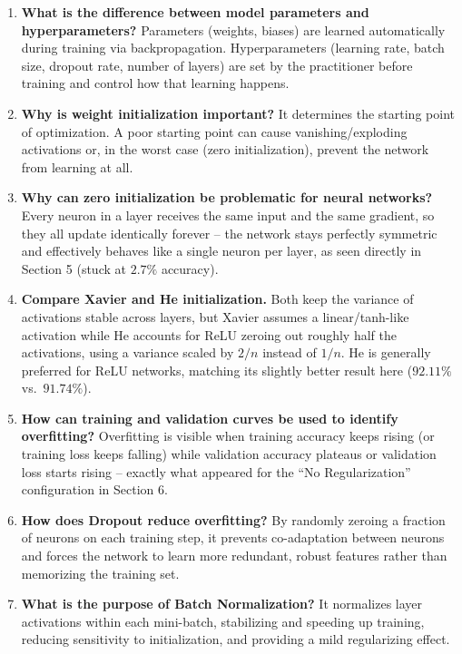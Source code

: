 \documentclass[10pt]{article}
\begin{document}
\begin{enumerate}
\item \textbf{What is the difference between model parameters and hyperparameters?}
Parameters (weights, biases) are learned automatically during training via
backpropagation. Hyperparameters (learning rate, batch size, dropout
rate, number of layers) are set by the practitioner before training
and control how that learning happens.

\item \textbf{Why is weight initialization important?}
It determines the starting point of optimization. A poor starting
point can cause vanishing/exploding activations or, in the worst case
(zero initialization), prevent the network from learning at all.

\item \textbf{Why can zero initialization be problematic for neural networks?}
Every neuron in a layer receives the same input and the same gradient,
so they all update identically forever -- the network stays perfectly
symmetric and effectively behaves like a single neuron per layer, as
seen directly in Section 5 (stuck at $2.7\%$ accuracy).

\item \textbf{Compare Xavier and He initialization.}
Both keep the variance of activations stable across layers, but Xavier
assumes a linear/tanh-like activation while He accounts for ReLU
zeroing out roughly half the activations, using a variance scaled by
$2/n$ instead of $1/n$. He is generally preferred for ReLU networks,
matching its slightly better result here ($92.11\%$ vs.\ $91.74\%$).

\item \textbf{How can training and validation curves be used to identify overfitting?}
Overfitting is visible when training accuracy keeps rising (or training
loss keeps falling) while validation accuracy plateaus or validation
loss starts rising -- exactly what appeared for the ``No Regularization''
configuration in Section 6.

\item \textbf{How does Dropout reduce overfitting?}
By randomly zeroing a fraction of neurons on each training step, it
prevents co-adaptation between neurons and forces the network to learn
more redundant, robust features rather than memorizing the training
set.

\item \textbf{What is the purpose of Batch Normalization?}
It normalizes layer activations within each mini-batch, stabilizing
and speeding up training, reducing sensitivity to initialization, and
providing a mild regularizing effect.


\end{enumerate}
\end{document}
